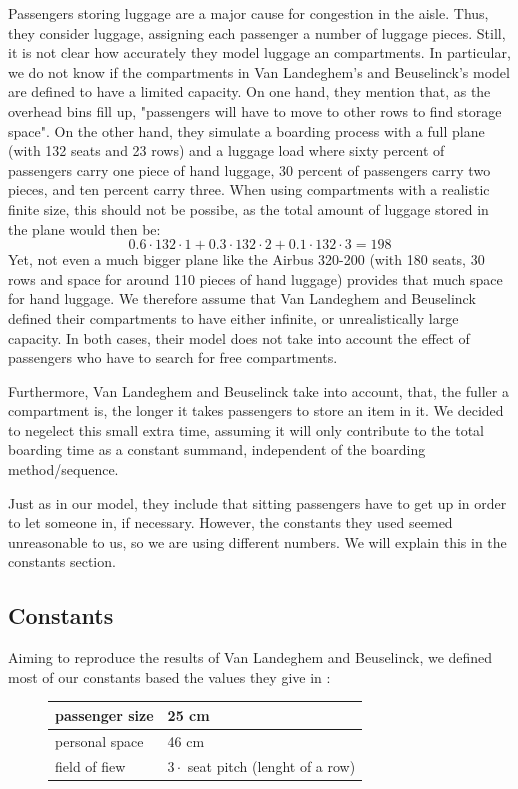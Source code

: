 \documentclass[11pt]{article}
\begin{document}
Passengers storing luggage are a major cause for congestion in the aisle. Thus, they consider luggage, assigning each passenger a number of luggage pieces. Still, it is not clear how accurately they model luggage an compartments. In particular, we do not know if the compartments in Van Landeghem's and Beuselinck's model are defined to have a limited capacity. On one hand, they mention that, as the overhead bins fill up, "passengers will have to move to other rows to find storage space"\cite{beus}. On the other hand, they simulate a boarding process with a full plane (with 132 seats and 23 rows) and a luggage load where sixty percent of passengers carry one piece of hand luggage, 30 percent of passengers carry two pieces, and ten percent carry three. When using compartments with a realistic finite size, this should not be possibe, as the total amount of luggage stored in the plane would then be:
$$ 0.6 \cdot 132 \cdot 1+ 0.3 \cdot 132 \cdot 2 + 0.1 \cdot 132 \cdot 3 = 198$$
Yet, not even a much bigger plane like the Airbus 320-200 (with 180 seats, 30 rows and space for around 110 pieces of hand luggage) provides that much space for hand luggage. We therefore assume that Van Landeghem and Beuselinck defined their compartments to have either infinite, or unrealistically large capacity. In both cases, their model does not take into account the effect of passengers who have to search for free compartments.


Furthermore, Van Landeghem and Beuselinck take into account, that, the fuller a compartment is, the longer it takes passengers to store an item in it. We decided to negelect this small extra time, assuming it will only contribute to the total boarding time as a constant summand, independent of the boarding method/sequence.


Just as in our model, they include that sitting passengers have to get up in order to let someone in, if necessary. However, the constants they used seemed unreasonable to us, so we are using different numbers. We will explain this in the constants section.


\subsection{Constants}
Aiming to reproduce the results of Van Landeghem and Beuselinck, we defined most of our constants based the values they give in \cite{beus}:

\begin{figure}[h!]
\begin{tabular}{l|l}

	\hline
	passenger size & 25 cm \\
	\hline
	personal space & 46 cm\\
	\hline
	field of fiew & $3 \cdot$ seat pitch (lenght of a row)\\
	\hline
\end{tabular}

\end{figure}
\end{document}

